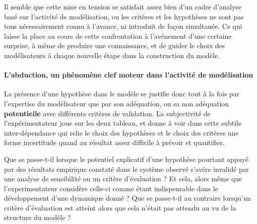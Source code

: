 Il semble que cette mise en tension se satisfait assez bien d'un cadre d'analyse basé sur l'activité de modélisation, ou les critères et les hypothèses ne sont pas tous nécessairement connu à l'avance, ni introduit de façon simultanée. Ce qui laisse la place au cours de cette confrontation à l'avénement d'une certaine surprise, à même de produire une connaissance, et de guider le choix des modélisateurs à chaque nouvelle étape dans la construction du modèle. 




\paragraph{L'abduction, un phénomène clef moteur dans l'activité de modélisation}

La présence d'une hypothèse dans le modèle se justifie donc tout à la fois par l'expertise du modélisateur que par son adéquation, ou sa non adéquation \textbf{potentielle} avec différents critères de validation. La subjectivité de l'expérimentateur joue sur les deux tableau, et donne à voir dans cette subtile inter-dépendance qui relie le choix des hypothèses et le choix des critères une forme incertitude quand au résultat assez difficile à prévoir et quantifier.

Que se passe-t-il lorsque le potentiel explicatif d'une hypothèse pourtant appuyé par des résultats empirique constaté dans le système observé s'avére invalidé par une analyse de sensibilité ou un critère d'évaluation ? Et cela, alors même que l'experimentateur considère celle-ci comme étant indispensable dans le développement d'une dynamique donné ? Que se passe-t-il au contraire lorsqu'un critère d'évaluation est atteint alors que cela n'était pas attendu au vu de la structure du modèle ? 


